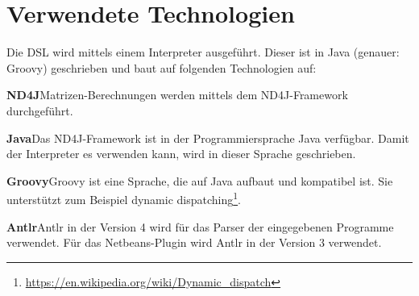 \section{Verwendete Technologien}
Die \ac{DSL} wird mittels einem Interpreter ausgeführt.
Dieser ist in Java (genauer: Groovy) geschrieben und baut auf folgenden Technologien auf:
\begin{description}
	\item{\textbf{ND4J}}\newline Matrizen-Berechnungen werden mittels dem ND4J-Framework durchgeführt.
	\item{\textbf{Java}}\newline Das ND4J-Framework ist in der Programmiersprache Java verfügbar. Damit der Interpreter es verwenden kann, wird in dieser Sprache geschrieben.
	\item{\textbf{Groovy}}\newline Groovy ist eine Sprache, die auf Java aufbaut und kompatibel ist. Sie unterstützt zum Beispiel dynamic dispatching\footnote{\url{https://en.wikipedia.org/wiki/Dynamic_dispatch}}.
	\item{\textbf{Antlr}}\newline Antlr in der Version 4 wird für das Parser der eingegebenen Programme verwendet. Für das Netbeans-Plugin wird Antlr in der Version 3 verwendet.
\end{description}

\endinput
